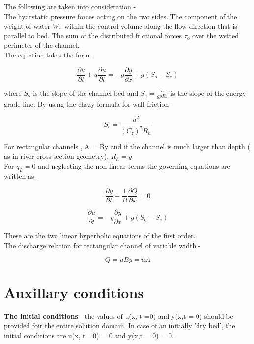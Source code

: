 \documentclass{article}
\begin{document}
The following are taken into consideration -\\

The hydrstatic pressure forces acting on the two sides.
The component of the weight of water \(W_x\) within the control volume along the flow direction that is
parallel to bed.
The sum of the distributed frictional forces \(\tau_o\) over the wetted perimeter of the channel.\\

The equation takes the form -

\[ \frac{\partial u}{\partial t} + u \frac{\partial u}{\partial t} = -g \frac{\partial y}{\partial x} + g(S_o - S_e) \] 

where \(S_o\) is the slope of the channel bed and \( S_e = \frac{\tau_o}{g\rho R_h}\) is the slope of the
energy grade line. 
By using the chezy formula for wall friction - 

\[ S_e = \frac{u^2}{(C_z)^2 R_h} \] 

For rectangular channels , A = By and if the channel is much larger than depth ( as in river cross section geometry).
\(R_h = y\)\\

For \(q_L =0 \) and neglecting the non linear terms the governing equations are written as - 

\begin{tcolorbox}[colback=blue!20!white, colframe=black, width=\textwidth, boxrule=0.5mm, sharp corners, left=1mm, right=1mm, top=1mm, bottom=1mm]
\[ \frac{\partial y}{\partial t} + \frac{1}{B} \frac{\partial Q}{\partial x} = 0 \] 

\[ \frac{\partial u }{\partial t}  = -g \frac{\partial y}{\partial x}  + g (S_o - S_e) \] 
\end{tcolorbox}

\noindent
These are the two linear hyperbolic equations of the first order.\\

The discharge relation for rectangular channel of variable width - 

\[ Q = uBy = uA \] 

\section{Auxillary conditions}

\textbf{The initial conditions} - the values of u(x, t =0) and y(x,t = 0) should be provided foir the entire
solution domain. In case of an initially 'dry bed', the initial conditions are u(x, t =0) = 0 and y(x,t = 0) = 0.\\
\end{document}
